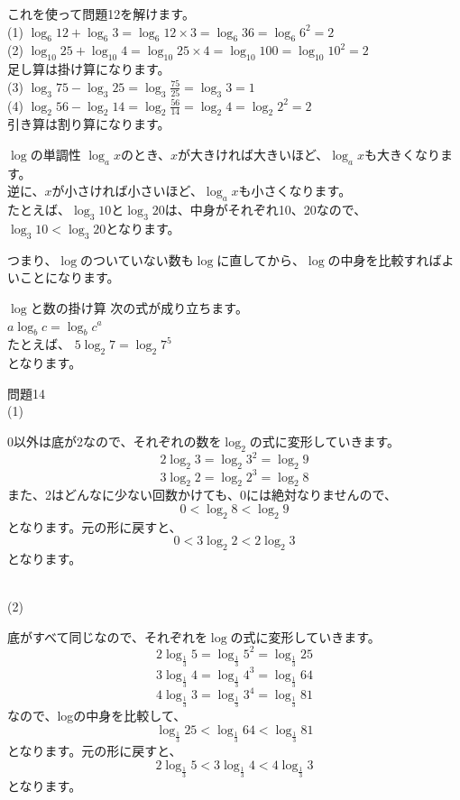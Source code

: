 \documentclass{jsarticle}
\newenvironment{indentblock}{\begin{adjustwidth}{\parindent}{}\hspace{-\parindent}}{\end{adjustwidth}}
\begin{document}
これを使って問題12を解けます。\\
(1) $\log_6 12+\log_6 3=\log_6 12\times 3=\log_6 36=\log_6 6^2=2$\\
(2) $\log_{10} 25+\log_{10} 4=\log_{10} 25\times 4=\log_{10} 100=\log_{10} 10^2=2$\\
足し算は掛け算になります。\\
(3) $\log_3 75-\log_3 25=\log_3 \frac{75}{25}=\log_3 3=1$\\
(4) $\log_2 56-\log_2 14=\log_2 \frac{56}{14}=\log_2 4=\log_2 2^2=2$\\
引き算は割り算になります。
%
\newpage
%
\begin{itembox}[l]{$\log$の単調性}
$\log_a x$のとき、$x$が大きければ大きいほど、$\log_a x$も大きくなります。\\
逆に、$x$が小さければ小さいほど、$\log_a x$も小さくなります。\\
たとえば、$\log_3 10$と$\log_3 20$は、中身がそれぞれ10、20なので、$\log_3 10<\log_3 20$となります。
\end{itembox}
つまり、$\log$のついていない数も$\log$に直してから、$\log$の中身を比較すればよいことになります。\\
\begin{itembox}[l]{$\log$と数の掛け算}
次の式が成り立ちます。\\
$a\log_b c=\log_b c^a$\\
たとえば、
$5\log_2 7=\log_2 7^5$\\
となります。
\end{itembox}
問題14\\
(1)
\begin{indentblock}
0以外は底が2なので、それぞれの数を$\log_2$の式に変形していきます。\\
\[2\log_2 3=\log_2 3^2=\log_2 9\]
\[3\log_2 2=\log_2 2^3=\log_2 8\]
また、2はどんなに少ない回数かけても、0には絶対なりませんので、
\[0<\log_2 8<\log_2 9\]
となります。元の形に戻すと、
\[0<3\log_2 2<2\log_2 3\]
となります。
\end{indentblock}
\dotfill\\
(2)
\begin{indentblock}
底がすべて同じなので、それぞれを$\log$の式に変形していきます。\\
\[2\log_{\frac{1}{3}} 5=\log_{\frac{1}{3}} 5^2=\log_{\frac{1}{3}} 25\]
\[3\log_{\frac{1}{3}} 4=\log_{\frac{1}{3}} 4^3=\log_{\frac{1}{3}} 64\]
\[4\log_{\frac{1}{3}} 3=\log_{\frac{1}{3}} 3^4=\log_{\frac{1}{3}} 81\]
なので、logの中身を比較して、
\[\log_{\frac{1}{3}} 25<\log_{\frac{1}{3}} 64< \log_{\frac{1}{3}} 81\]
となります。元の形に戻すと、
\[2\log_{\frac{1}{3}} 5<3\log_{\frac{1}{3}} 4<4\log_{\frac{1}{3}} 3\]
となります。
\end{indentblock}
\end{document}
